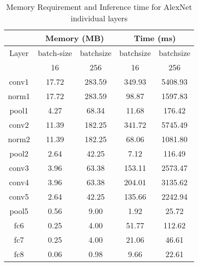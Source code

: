 \begin{table}[h!]
\centering
\begin{tabular}{|c|c|c|c|c|}
\hline
      & \multicolumn{2}{c|}{Memory (MB)} & \multicolumn{2}{c|}{Time (ms)} \\ \hline
Layer  & batch-size & batchsize & batchsize& batchsize \\
 &16 & 256 & 16 & 256 \\ \hline
conv1  &  17.72 & 283.59 &  349.93 &  5408.93 \\ \hline
norm1  &  17.72 & 283.59 &  98.87 & 1597.83 \\ \hline
pool1  &  4.27 &  68.34 & 11.68 & 176.42 \\ \hline
conv2  &  11.39 & 182.25 &  341.72 &  5745.49 \\ \hline
norm2  &  11.39 & 182.25 &  68.06 & 1081.80 \\ \hline
pool2  &  2.64 &  42.25 & 7.12 &  116.49 \\ \hline
conv3  &  3.96 &  63.38 & 153.11 &  2573.47 \\ \hline
conv4  &  3.96 &  63.38 & 204.01 &  3135.62 \\ \hline
conv5  &  2.64 &  42.25 & 135.66 &  2242.94 \\ \hline
pool5  &  0.56 &  9.00 &  1.92 &  25.72 \\ \hline
fc6  &  0.25 &  4.00 &  51.77 & 112.62 \\ \hline
fc7  &  0.25 &  4.00 &  21.06 & 46.61 \\ \hline
fc8  &  0.06 &  0.98 &  9.66 &  22.61 \\ \hline

\end{tabular}
\caption{Memory Requirement and Inference time for AlexNet individual layers}
\label{tab:batch}
\end{table}



